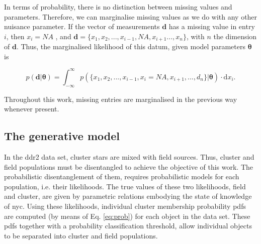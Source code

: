 In terms of probability, there is no distinction between missing values and parameters. Therefore, we can marginalise missing values as we do with any other nuisance parameter. If the vector of measurements $\mathbf{d}$ has a missing value in entry $i$, then $x_{i} = NA$ , and $\mathbf{d}=\{x_1,x_2,...,x_{i-1},NA,x_{i+1}...,x_n\}$, with $n$ the dimension of $\mathbf{d}$. Thus, the marginalised likelihood of this datum, given model parameters $\boldsymbol{\theta}$ is

\begin{equation}
\label{eq:marginalmiss}
p(\mathbf{d}|\boldsymbol{\theta})= \int_{-\infty}^{\infty} p(\{x_1,x_2,...,x_{i-1},x_{i}= NA,x_{i+1},...,d_n\}|\boldsymbol{\theta})\cdot \mathrm{d}x_{i}.
\end{equation}

Throughout this work, missing entries are marginalised in the previous way whenever present.


\subsection{The generative model}
\label{sect:generative-model}
{In the \gls{ddr2} data set, cluster stars are mixed with field sources. Thus, cluster and field populations must be disentangled to achieve the objective of this work. The probabilistic disentanglement of them, requires probabilistic models for each population, i.e. their likelihoods. The true values of these two likelihoods, field and cluster, are given by parametric relations embodying the state of knowledge of \gls{nyc}.  Using these likelihoods, individual cluster membership probability \glspl{pdf}  are computed (by means of Eq. \ref{eq:prob}) for each object in the data set. These \glspl{pdf}  together with a probability classification threshold,  allow individual objects to be separated into cluster and field populations.}

